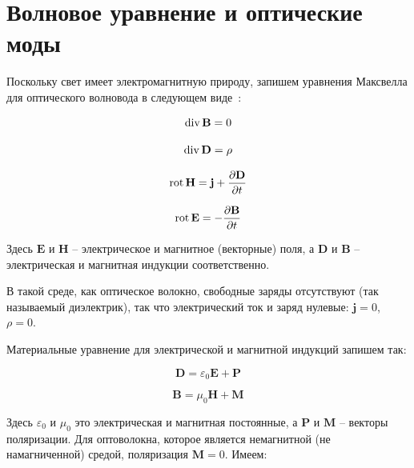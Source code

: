 \section{Волновое уравнение и оптические моды}

Поскольку свет имеет электромагнитную природу, запишем уравнения Максвелла для оптического волновода в следующем виде~\cite{diament1990wave}:


\begin{equation}
	\mathop{\mathrm{div}}\nolimits \mathbf{B} = 0
\end{equation}


\begin{equation}
	\mathop{\mathrm{div}}\nolimits \mathbf{D} = \rho
\end{equation}


\begin{equation}
	\mathop{\mathrm{rot}}\nolimits \mathbf{H} = \mathbf{j} + \frac{\partial \mathbf{D}}{\partial t}
\end{equation}


\begin{equation}
	\mathop{\mathrm{rot}}\nolimits \mathbf{E} = - \frac{\partial \mathbf{B}}{\partial t}
\end{equation}

Здесь $\mathbf{E}$ и $\mathbf{H}$ -- электрическое и магнитное (векторные) поля, а $\mathbf{D}$ и $\mathbf{B}$ -- электрическая и магнитная индукции соответственно.

В такой среде, как оптическое волокно, свободные заряды отсутствуют (так называемый диэлектрик), так что электрический ток и заряд нулевые: $\mathbf{j} = 0$, $\rho = 0$.

Материальные уравнение для электрической и магнитной индукций запишем так:

\begin{equation}
	\mathbf{D} = \varepsilon_0 \mathbf{E} + \mathbf{P}
\end{equation}

\begin{equation}
	\mathbf{B} = \mu_0 \mathbf{H} + \mathbf{M}
\end{equation}

Здесь $\varepsilon_0$ и $\mu_0$ это электрическая и магнитная постоянные, а $\mathbf{P}$ и $\mathbf{M}$ -- векторы поляризации. Для оптоволокна, которое является немагнитной (не намагниченной) средой, поляризация $\mathbf{M} = 0$. Имеем:

